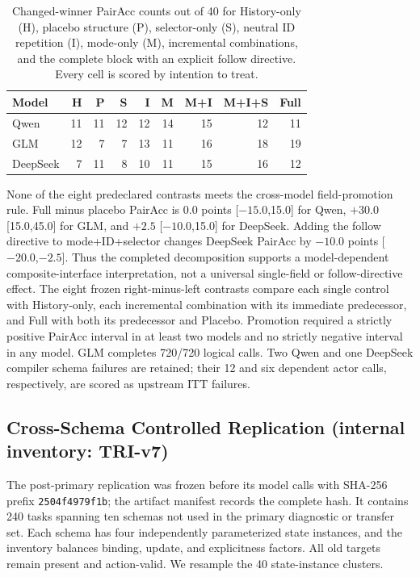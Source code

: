 \documentclass[10pt]{article}
\begin{document}
\begin{table}[H]
\centering
\scriptsize
\setlength{\tabcolsep}{2.6pt}
\begin{tabular}{lrrrrrrrr}
\toprule
Model & H & P & S & I & M & M+I & M+I+S & Full \\
\midrule
Qwen & 11 & 11 & 12 & 12 & 14 & 15 & 12 & 11 \\
GLM & 12 & 7 & 7 & 13 & 11 & 16 & 18 & 19 \\
DeepSeek & 7 & 11 & 8 & 10 & 11 & 15 & 16 & 12 \\
\bottomrule
\end{tabular}
\caption{Changed-winner PairAcc counts out of 40 for History-only (H), placebo structure (P),
selector-only (S), neutral ID repetition (I), mode-only (M), incremental combinations, and the
complete block with an explicit follow directive. Every cell is scored by intention to treat.}
\label{tab:supp-decision-decomposition-v2}
\end{table}

None of the eight predeclared contrasts meets the cross-model field-promotion rule. Full minus
placebo PairAcc is $0.0$ points [$-15.0$,15.0] for Qwen, $+30.0$ [15.0,45.0] for GLM, and $+2.5$
[$-10.0$,15.0] for DeepSeek. Adding the follow directive to mode+ID+selector changes DeepSeek
PairAcc by $-10.0$ points [$-20.0$,$-2.5$]. Thus the completed decomposition supports a
model-dependent composite-interface interpretation, not a universal single-field or follow-directive
effect. The eight frozen right-minus-left contrasts compare each single control with History-only,
each incremental combination with its immediate predecessor, and Full with both its predecessor and
Placebo. Promotion required a strictly positive PairAcc interval in at least two models and no
strictly negative interval in any model. GLM completes 720/720 logical calls. Two Qwen and one DeepSeek compiler schema failures are
retained; their 12 and six dependent actor calls, respectively, are scored as upstream ITT failures.

\FloatBarrier

\subsection{Cross-Schema Controlled Replication (internal inventory: TRI-v7)}
The post-primary replication was frozen before its model calls with SHA-256 prefix
\texttt{2504f4979f1b}; the artifact manifest records the complete hash.
It contains 240 tasks spanning ten schemas not used in the primary diagnostic or transfer set. Each
schema has four independently parameterized state instances, and the inventory balances binding,
update, and explicitness factors.
All old targets remain present and action-valid. We resample the 40 state-instance clusters.
\end{document}
